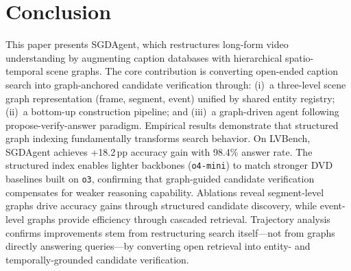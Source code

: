 \documentclass[sigconf, screen, review, anonymous]{acmart}
\begin{document}
\section{Conclusion}

This paper presents SGDAgent, which restructures long-form video understanding by augmenting caption databases with hierarchical spatio-temporal scene graphs. The core contribution is converting open-ended caption search into graph-anchored candidate verification through: (i)~a three-level scene graph representation (frame, segment, event) unified by shared entity registry; (ii)~a bottom-up construction pipeline; and (iii)~a graph-driven agent following propose-verify-answer paradigm.
Empirical results demonstrate that structured graph indexing fundamentally transforms search behavior. On LVBench\cite{lvbench}, SGDAgent achieves +18.2\,pp accuracy gain with 98.4\% answer rate. The structured index enables lighter backbones (\texttt{o4-mini}) to match stronger DVD baselines\cite{deepvideo2025} built on \texttt{o3}, confirming that graph-guided candidate verification compensates for weaker reasoning capability. Ablations reveal segment-level graphs drive accuracy gains through structured candidate discovery, while event-level graphs provide efficiency through cascaded retrieval. Trajectory analysis confirms improvements stem from restructuring search itself—not from graphs directly answering queries—by converting open retrieval into entity- and temporally-grounded candidate verification.





\end{document}
